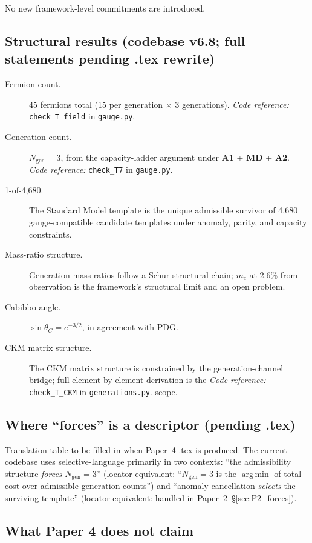 \documentclass[11pt]{article}
\newcommand{\coderef}[2]{\smallskip\noindent\textit{Code reference:} \texttt{#1} in \texttt{#2}.}
\newcommand{\Aone}{\textbf{A1}}
\newcommand{\argmin}{\mathop{\mathrm{arg\,min}}}
\begin{document}
\noindent No new framework-level commitments are introduced.

\subsection{Structural results (codebase v6.8; full statements pending .tex rewrite)}\label{sec:P4_results}

\begin{description}
    \item[Fermion count.] 45 fermions total (15 per generation $\times$ 3 generations). \coderef{check\_T\_field}{gauge.py}
    \item[Generation count.] $N_{\mathrm{gen}} = 3$, from the capacity-ladder argument under \Aone{} + \textbf{MD} + \textbf{A2}. \coderef{check\_T7}{gauge.py}
    \item[1-of-4,680.] The Standard Model template is the unique admissible survivor of 4,680 gauge-compatible candidate templates under anomaly, parity, and capacity constraints.
    \item[Mass-ratio structure.] Generation mass ratios follow a Schur-structural chain; $m_c$ at 2.6\% from observation is the framework's structural limit and an open problem.
    \item[Cabibbo angle.] $\sin\theta_C = e^{-3/2}$, in agreement with PDG.
    \item[CKM matrix structure.] The CKM matrix structure is constrained by the generation-channel bridge; full element-by-element derivation is the \coderef{check\_T\_CKM}{generations.py} scope.
\end{description}

\subsection{Where ``forces'' is a descriptor (pending .tex)}\label{sec:P4_forces}

Translation table to be filled in when Paper~4 .tex is produced. The current codebase uses selective-language primarily in two contexts: ``the admissibility structure \emph{forces} $N_{\mathrm{gen}} = 3$'' (locator-equivalent: ``$N_{\mathrm{gen}} = 3$ is the $\argmin$ of total cost over admissible generation counts'') and ``anomaly cancellation \emph{selects} the surviving template'' (locator-equivalent: handled in Paper~2~\S\ref{sec:P2_forces}).

\subsection{What Paper 4 does not claim}\label{sec:P4_does_not_claim}
\end{document}
